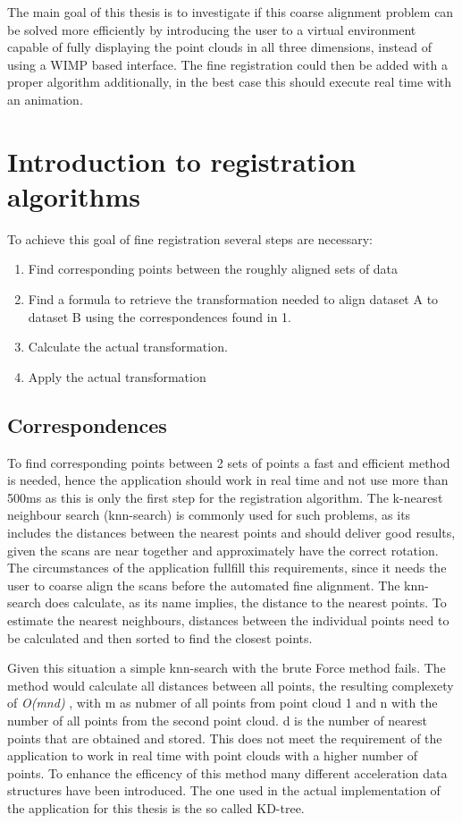\documentclass[hyperref,english,bachelorofscience,bibnum]{cgvpub}
\begin{document}
The main goal of this thesis is to investigate if this coarse alignment problem can be solved more efficiently by introducing the user to a virtual environment capable of fully displaying the point clouds in all three dimensions, instead of using a WIMP based interface.
The fine registration could then be added with a proper algorithm additionally, in the best case this should execute real time with an animation.

\section{Introduction to registration algorithms}

To achieve this goal of fine registration several steps are necessary:
\begin{enumerate}
\item  Find corresponding points between the roughly aligned sets of data
\item  Find a formula to retrieve the transformation needed to align dataset A to dataset B using the correspondences found in 1.
\item Calculate the actual transformation.
\item Apply the actual transformation
\end{enumerate}

\subsection{Correspondences}

To find corresponding points between 2 sets of points a fast and efficient method is needed, hence the application should work in real time and not use more than 500ms as this is only the first step for the registration algorithm.
The k-nearest neighbour search (knn-search) is commonly used for such problems, as its includes the distances between the nearest points and should deliver good results, given the scans are near together and approximately have the correct rotation. The circumstances of the application fullfill this requirements, since it needs the user to coarse align the scans before the automated fine alignment.
The knn-search does calculate, as its name implies, the distance to the nearest points. To estimate the nearest neighbours, distances between the individual points need to be calculated and then sorted to find the closest points.

Given this situation a simple knn-search with the brute Force method fails. The method would calculate all distances between all points, the resulting complexety of  \textit{O(mnd)} \cite{Garcia2008}, with m as nubmer of all points from point cloud 1 and n with the number of all points from the second point cloud. d is the number of nearest points that are obtained and stored. This does not meet the requirement of the application to work in real time with point clouds with a higher number of points.
To enhance the efficency of this method many different acceleration data structures have been introduced. The one used in the actual implementation of the application for this thesis is the so called KD-tree.
\end{document}
